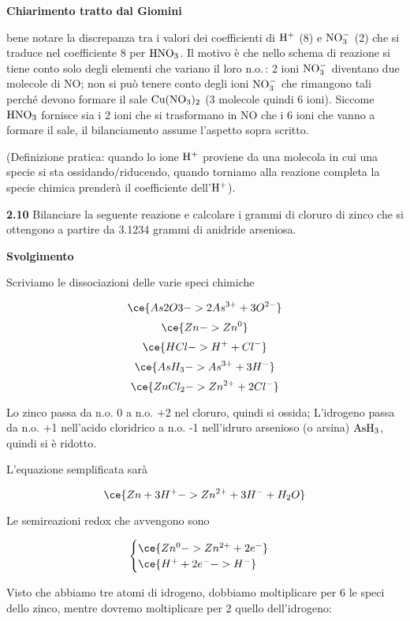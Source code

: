 \textbf{Chiarimento tratto dal Giomini}

\E bene notare la discrepanza tra i valori dei coefficienti di $\rm H^+$ (8) e $\rm NO_3^-$ (2) che si traduce nel coefficiente 8 per $\rm HNO_3$. Il motivo è che nello schema di reazione si tiene conto solo degli elementi che variano il loro n.o.\,: 2 ioni $\rm NO_3^-$ diventano due molecole di NO; non si può tenere conto degli ioni $\rm NO_3^-$ che rimangono tali perché devono formare il sale $\rm Cu(NO_3)_2$ (3 molecole quindi 6 ioni). Siccome $\rm HNO_3$ fornisce sia i 2 ioni che si trasformano in NO che i 6 ioni che vanno a formare il sale, il bilanciamento assume l'aspetto sopra scritto.

(Definizione pratica: quando lo ione $\rm H^+$ proviene da una molecola in cui una specie si sta ossidando/riducendo, quando torniamo alla reazione completa la specie chimica prenderà il coefficiente dell'$\rm H^+$).

\vspace{0.2cm}\textbf{2.10} Bilanciare la seguente reazione e calcolare i grammi di cloruro di zinco che si ottengono a partire da 3.1234 grammi di anidride arseniosa.

\begin{center}
\end{center}

\large\textbf{Svolgimento}\normalsize

\vspace{0.2cm}Scriviamo le dissociazioni delle varie speci chimiche

$$\ce{As2O3 -> 2As^{3+} + 3O^{2-}}$$
$$\ce{Zn -> Zn^0}$$
$$\ce{HCl -> H^+ + Cl^-}$$
$$\ce{AsH_3 -> As^{3+} + 3H^{-}}$$
$$\ce{ZnCl_2 -> Zn^{2+} + 2Cl^{-}}$$

Lo zinco passa da n.o. 0 a n.o. +2 nel cloruro, quindi si ossida; L'idrogeno passa da n.o. +1 nell'acido cloridrico a n.o. -1 nell'idruro arsenioso (o arsina) $\rm AsH_3$, quindi si è ridotto.

L'equazione semplificata sarà

$$\ce{Zn + 3H^+ -> Zn^{2+} + 3H^- + H_2O }$$

Le semireazioni redox che avvengono sono

$$\begin{cases}
    \ce{Zn^{0} -> Zn^{2+} + 2e^-}\\
    \ce{H^+ + 2e^- -> H^-}
\end{cases}$$

Visto che abbiamo tre atomi di idrogeno, dobbiamo moltiplicare per 6 le speci dello zinco, mentre dovremo moltiplicare per 2 quello dell'idrogeno:

